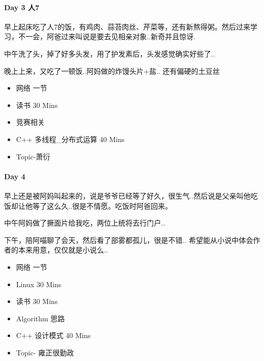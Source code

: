\documentclass[UTF8,a4paper,8pt]{ctexart}
\begin{document}
 	 \paragraph{Day 3   人7    \quad     }
	 	 早上起床吃了人7的饭，有鸡肉、蒜苔肉丝、芹菜等，还有新熬得粥。然后过来学习，不一会，阿爸过来叫说是要去见相亲对象..新奇并且惊讶.
	 	 
	 	 中午洗了头，掉了好多头发，用了护发素后，头发感觉确实好些了..
	 	 
	 	 晚上上来，又吃了一顿饭..阿妈做的炸馒头片+盐.. 还有偏硬的土豆丝
		 \begin{itemize}
		 	\item  网络  一节
		 	
		 	\item  读书  30 Mins		 	 
		 	\item  竞赛相关
		 	\item  \makebox[0pt][l]{$\square$}\raisebox{.15ex}{\hspace{0.1em}$\checkmark$} C++ 多线程\_分布式运算 40 Mins
		 	
		 	\item  Topic-萧衍
		 \end{itemize}
		 
 	 \paragraph{Day 4       \quad     }
	 	 早上还是被阿妈叫起来的，说是爷爷已经等了好久，很生气..然后说是父亲叫他吃饭却让他等了这么久..很是不情愿。吃饭时阿爸回来。
	 	 
	 	 中午阿妈做了撅面片给我吃，两位上统将去行门户..
	 	 
	 	 下午，陪阿喵聊了会天，然后看了部雾都孤儿，很是不错.. 希望能从小说中体会作者的本来用意，仅仅就是小说么..
	 	 
	 	 \begin{itemize}
	 	 	\item  网络  一节
	 	 	\item  Linux 30 Mins
	 	 	
	 	 	\item  \makebox[0pt][l]{$\square$}\raisebox{.15ex}{\hspace{0.1em}$\checkmark$}读书  30 Mins		 	 
	 	 	\item  Algorithm 思路
	 	 	\item  \makebox[0pt][l]{$\square$}\raisebox{.15ex}{\hspace{0.1em}$\checkmark$} C++ 设计模式 40 Mins
	 	 	
	 	 	\item  \makebox[0pt][l]{$\square$}\raisebox{.15ex}{\hspace{0.1em}$\checkmark$} Topic- 雍正很勤政
	 	 \end{itemize}
\end{document}

